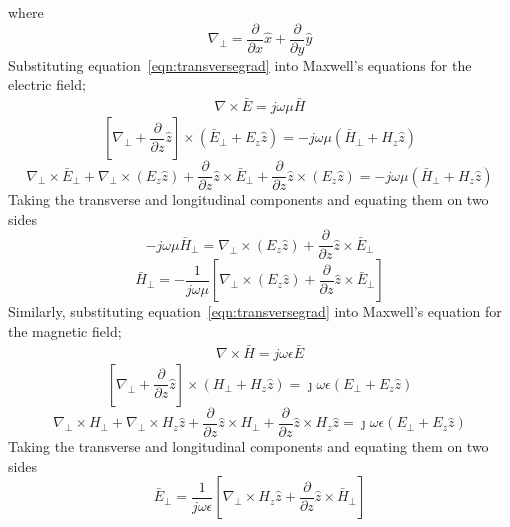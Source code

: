 where
\begin{equation*}
\nabla_\bot = \frac{\partial}{\partial x}\hat{x} + \frac{\partial}{\partial y}\hat{y}
\end{equation*}
Substituting equation~\ref{eqn:transversegrad} into Maxwell's equations for the electric field;
\begin{align*}
\nabla\times\bar{E} = j\omega\mu\bar{H}
\end{align*}
\begin{dmath*}
\left[\nabla_\bot + \frac{\partial}{\partial z}\hat{z}\right]\times(\bar{E}_\bot + E_z\hat{z}) = -j\omega\mu(\bar{H}_\bot + H_z\hat{z})
\end{dmath*}
\begin{dmath*}
\nabla_\bot\times\bar{E}_\bot + \nabla_\bot\times(E_z\hat{z}) + \frac{\partial}{\partial z}\hat{z}\times\bar{E}_\bot + \frac{\partial}{\partial z}\hat{z}\times(E_z\hat{z}) = -j\omega\mu(\bar{H}_\bot + H_z\hat{z})
\end{dmath*}
Taking the transverse and longitudinal components and equating them on two sides
\begin{dmath*}
-j\omega\mu\bar{H}_\bot = \nabla_\bot\times(E_z\hat{z}) + \frac{\partial}{\partial z}\hat{z}\times\bar{E}_\bot
\end{dmath*}
\begin{dmath}
\bar{H}_\bot = -\frac{1}{j\omega\mu} \left[\nabla_\bot\times(E_z\hat{z}) + \frac{\partial}{\partial z}\hat{z}\times\bar{E}_\bot\right]
\label{eqn:transversemag}
\end{dmath}
Similarly, substituting equation~\ref{eqn:transversegrad}  into Maxwell's equation for the magnetic field;
\begin{align*}
\nabla\times\bar{H} = j\omega\epsilon\bar{E}
\end{align*}
\begin{dmath*}
\left[ \nabla_\bot + \frac{\partial}{\partial z}\hat{z} \right] \times (H_\bot + H_z \hat{z}) = \jmath \omega\epsilon (E_\bot + E_z \hat{z})
\end{dmath*}
\begin{dmath*}
\nabla_\bot\times H_\bot + \nabla_\bot\times H_z \hat{z} +  \frac{\partial}{\partial z}\hat{z}\times H_\bot + \frac{\partial}{\partial z}\hat{z}\times H_z \hat{z} = \jmath \omega\epsilon (E_\bot + E_z \hat{z})
\end{dmath*}
Taking the transverse and longitudinal components and equating them on two sides
\begin{dmath}
\bar{E}_\bot = \frac{1}{j\omega\epsilon} \left[\nabla_\bot\times H_z\hat{z} + \frac{\partial}{\partial z}\hat{z}\times\bar{H}_\bot\right]
\label{eqn:transverseele}
\end{dmath}
